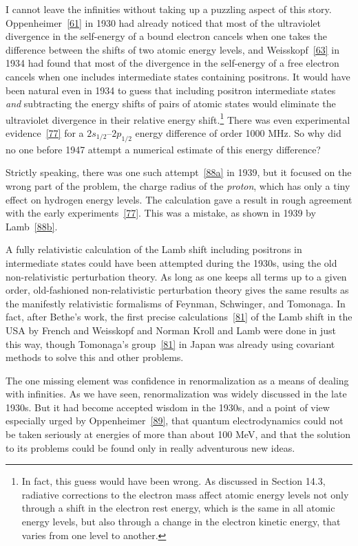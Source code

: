 I cannot leave the infinities without taking up a puzzling aspect of this story. Oppenheimer~\hyperref[ref:1.61]{[61]} in 1930 had already noticed that most of the ultraviolet divergence in the self-energy of a bound electron cancels when one takes the difference between the shifts of two atomic energy levels, and Weisskopf~\hyperref[ref:1.63]{[63]} in 1934 had found that most of the divergence in the self-energy of a free electron cancels when one includes intermediate states containing positrons. It would have been natural even in 1934 to guess that including positron intermediate states \emph{and} subtracting the energy shifts of pairs of atomic states would eliminate the ultraviolet divergence in their relative energy shift.\footnote{In fact, this guess would have been wrong. As discussed in Section 14.3, radiative corrections to the electron mass affect atomic energy levels not only through a shift in the electron rest energy, which is the same in all atomic energy levels, but also through a change in the electron kinetic energy, that varies from one level to another.} There was even experimental evidence~\hyperref[ref:1.77]{[77]} for a $2s_{1/2}$--$2p_{1/2}$ energy difference of order 1000 MHz. So why did no one before 1947 attempt a numerical estimate of this energy difference?

Strictly speaking, there was one such attempt~\hyperref[ref:1.88a]{[88a]} in 1939, but it focused on the wrong part of the problem, the charge radius of the \emph{proton}, which has only a tiny effect on hydrogen energy levels. The calculation gave a result in rough agreement with the early experiments~\hyperref[ref:1.77]{[77]}. This was a mistake, as shown in 1939 by Lamb~\hyperref[ref:1.88b]{[88b]}.

A fully relativistic calculation of the Lamb shift including positrons in intermediate states could have been attempted during the 1930s, using the old non-relativistic perturbation theory. As long as one keeps all terms up to a given order, old-fashioned non-relativistic perturbation theory gives the same results as the manifestly relativistic formalisms of Feynman, Schwinger, and Tomonaga. In fact, after Bethe's work, the first precise calculations~\hyperref[ref:1.81]{[81]} of the Lamb shift in the USA by French and Weisskopf and Norman Kroll and Lamb were done in just this way, though Tomonaga's group~\hyperref[ref:1.81]{[81]} in Japan was already using covariant methods to solve this and other problems.

The one missing element was confidence in renormalization as a means of dealing with infinities. As we have seen, renormalization was widely discussed in the late 1930s. But it had become accepted wisdom in the 1930s, and a point of view especially urged by Oppenheimer~\hyperref[ref:1.89]{[89]}, that quantum electrodynamics could not be taken seriously at energies of more than about 100 MeV, and that the solution to its problems could be found only in really adventurous new ideas.

